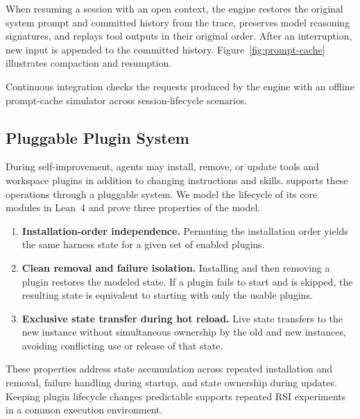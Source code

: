 When resuming a session with an open context, the engine restores the original system prompt and committed history from the trace, preserves model reasoning signatures, and replays tool outputs in their original order. After an interruption, new input is appended to the committed history. Figure~\ref{fig:prompt-cache} illustrates compaction and resumption.

Continuous integration checks the requests produced by the engine with an offline prompt-cache simulator across session-lifecycle scenarios.

\subsection{Pluggable Plugin System}
\label{sec:plugins}

During self-improvement, agents may install, remove, or update tools and workspace plugins in addition to changing instructions and skills. \fwname supports these operations through a pluggable system. We model the lifecycle of its core modules in Lean~4 and prove three properties of the model.

\begin{enumerate}
  \item \textbf{Installation-order independence.} Permuting the installation order yields the same harness state for a given set of enabled plugins.
  \item \textbf{Clean removal and failure isolation.} Installing and then removing a plugin restores the modeled state. If a plugin fails to start and is skipped, the resulting state is equivalent to starting with only the usable plugins.
  \item \textbf{Exclusive state transfer during hot reload.} Live state transfers to the new instance without simultaneous ownership by the old and new instances, avoiding conflicting use or release of that state.
\end{enumerate}

These properties address state accumulation across repeated installation and removal, failure handling during startup, and state ownership during updates. Keeping plugin lifecycle changes predictable supports repeated RSI experiments in a common execution environment.
